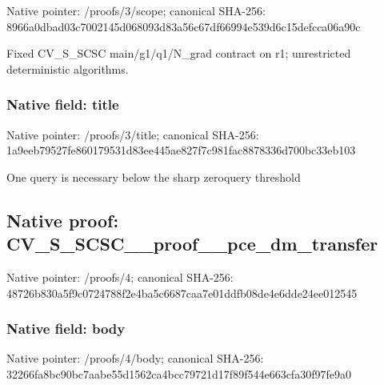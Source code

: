 \documentclass[10pt,a4paper]{article}
\begin{document}
Native pointer: /proofs/3/scope; canonical SHA-256: 8966a0dbad03c7002145d068\allowbreak{}093d83a56c67df66994e539d\allowbreak{}6c15defcca06a90c


Fixed CV\_S\_SCSC main/g1/q1/N\_grad contract on r1; unrestricted deterministic algorithms.


\subsubsection{Native field: title}


Native pointer: /proofs/3/title; canonical SHA-256: 1a9eeb79527fe860179531d8\allowbreak{}3ee445ae827f7c981fac8878\allowbreak{}336d700bc33eb103


One query is necessary below the sharp zeroquery threshold


\subsection{Native proof: CV\_S\_SCSC\_\_proof\_\_pce\_dm\_transfer}


Native pointer: /proofs/4; canonical SHA-256: 48726b830a5f9c0724788f2e\allowbreak{}4ba5c6687caa7e01ddfb08de\allowbreak{}4e6dde24ee012545



\subsubsection{Native field: body}


Native pointer: /proofs/4/body; canonical SHA-256: 32266fa8bc90bc7aabe55d15\allowbreak{}62ca4bcc79721d17f89f544e\allowbreak{}663cfa30f97fe9a0
\end{document}
